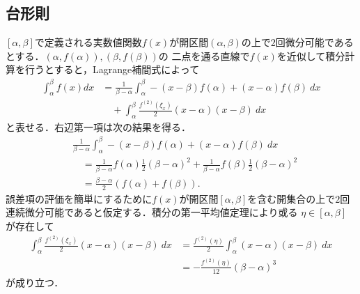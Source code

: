 \documentclass[a4j,papersize,disablejfam,slide,14pt]{jsarticle}
\begin{document}
\subsection{台形則}
	$[\alpha, \beta]$で定義される実数値関数$f(x)$が開区間$(\alpha, \beta)$の上で$2$回微分可能であるとする．$(\alpha, f(\alpha)), (\beta, f(\beta))$の
    二点を通る直線で$f(x)$を近似して積分計算を行うとすると，{\rm Lagrange}補間式によって
    \begin{align}
    	\int_{\alpha}^{\beta} f(x) dx &= \frac{1}{\beta - \alpha} \int_{\alpha}^{\beta} -(x-\beta)f(\alpha) + (x-\alpha)f(\beta)\ dx \\
        &\quad+ \int_{\alpha}^{\beta} \frac{f^{(2)}(\xi_x)}{2}(x-\alpha)(x-\beta)\ dx
    \end{align}
    と表せる．右辺第一項は次の結果を得る．
    \begin{align}
    	&\frac{1}{\beta - \alpha} \int_{\alpha}^{\beta} -(x-\beta)f(\alpha) + (x-\alpha)f(\beta)\ dx \\
        &\quad= \frac{1}{\beta - \alpha} f(\alpha) \frac{1}{2} (\beta - \alpha)^2 + \frac{1}{\beta - \alpha} f(\beta) \frac{1}{2} (\beta - \alpha)^2 \\
        &\quad= \frac{\beta - \alpha}{2} \left( f(\alpha) + f(\beta) \right).
    \end{align}
    誤差項の評価を簡単にするために$f(x)$が開区間$[\alpha, \beta]$を含む開集合の上で$2$回連続微分可能であると仮定する．積分の第一平均値定理により或る
    $\eta \in [\alpha, \beta]$が存在して
    \begin{align}
    	\int_{\alpha}^{\beta} \frac{f^{(2)}(\xi_x)}{2}(x-\alpha)(x-\beta)\ dx &= \frac{f^{(2)}(\eta)}{2} \int_{\alpha}^{\beta} (x-\alpha)(x-\beta)\ dx \\
        &= -\frac{f^{(2)}(\eta)}{12} (\beta - \alpha)^3
    \end{align}
    が成り立つ．
\end{document}
